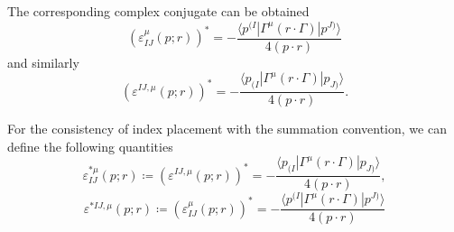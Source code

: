 \documentclass[12pt]{article}
\newcommand{\aket}[1]{|#1\rangle}
\newcommand{\abra}[1]{\langle #1|}
\begin{document}
The corresponding complex conjugate can be obtained
\begin{equation}
    (\varepsilon^\mu_{IJ}(p;r))^*=-\frac{\abra{p^{(I}}\Gamma^\mu(r\cdot \Gamma)\aket{p^{J)}}}{4(p\cdot r)}
\end{equation}
and similarly
\begin{equation}
    (\varepsilon^{IJ,\mu}(p;r))^*=-\frac{\abra{p_{(I}}\Gamma^\mu(r\cdot \Gamma)\aket{p_{J)}}}{4(p\cdot r)}.
\end{equation}

For the consistency of index placement with the summation convention, we can define the following quantities
\begin{equation}
    \varepsilon^{*\mu}_{IJ}(p;r)\coloneqq  (\varepsilon^{IJ,\mu}(p;r))^*=-\frac{\abra{p_{(I}}\Gamma^\mu(r\cdot \Gamma)\aket{p_{J)}}}{4(p\cdot r)},
\end{equation}
\begin{equation}
    \varepsilon^{*IJ,\mu}(p;r)\coloneqq (\varepsilon^\mu_{IJ}(p;r))^*=-\frac{\abra{p^{(I}}\Gamma^\mu(r\cdot \Gamma)\aket{p^{J)}}}{4(p\cdot r)}
\end{equation}
\end{document}
